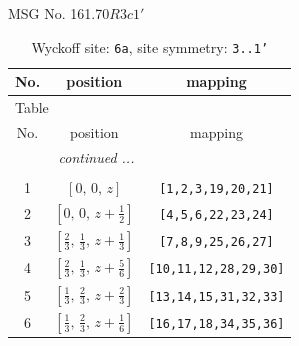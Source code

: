 \documentclass[fleqn,8pt]{jsarticle}
\begin{document}
\setcounter{MaxMatrixCols}{32}

\renewcommand{\tablename}{Table~}
\renewcommand{\figurename}{Figure~}
\begin{center}
\LARGE
MSG No. 161.70\quad$R3c1'$
\end{center}
\renewcommand{\arraystretch}{1.2}
\begin{longtable}{ccc}
\caption{Wyckoff site: {\tt 6a}, site symmetry: {\tt 3..1'}}
 \\
 \hline \hline
No. & position & mapping \\ \hline \endfirsthead

\multicolumn{2}{l}{\tablename\ \thetable{}} \\
 \hline \hline
No. & position & mapping \\ \hline \endhead

 \hline \hline
\multicolumn{2}{r}{\footnotesize\it continued ...} \\ \endfoot

 \hline \hline
\multicolumn{2}{r}{} \\ \endlastfoot

1 & $\left[ 0,\, 0,\, z \right]$ & {\tt [1,2,3,19,20,21]} \\ \hline
2 & $\left[ 0,\, 0,\, z + \frac{1}{2} \right]$ & {\tt [4,5,6,22,23,24]} \\ \hline
3 & $\left[ \frac{2}{3},\, \frac{1}{3},\, z + \frac{1}{3} \right]$ & {\tt [7,8,9,25,26,27]} \\ \hline
4 & $\left[ \frac{2}{3},\, \frac{1}{3},\, z + \frac{5}{6} \right]$ & {\tt [10,11,12,28,29,30]} \\ \hline
5 & $\left[ \frac{1}{3},\, \frac{2}{3},\, z + \frac{2}{3} \right]$ & {\tt [13,14,15,31,32,33]} \\ \hline
6 & $\left[ \frac{1}{3},\, \frac{2}{3},\, z + \frac{1}{6} \right]$ & {\tt [16,17,18,34,35,36]} \\
\end{longtable}
\renewcommand{\arraystretch}{1.2}
\end{document}
